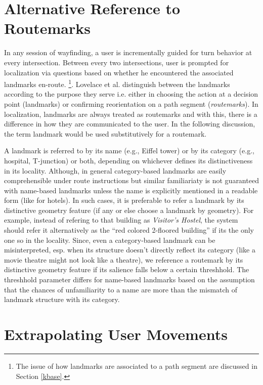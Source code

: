 \documentclass{iitkthesis}
\begin{document}
\section{Alternative Reference to Routemarks}
\label{sec:altref}
In any session of wayfinding, a user is incrementally guided for turn behavior at every intersection. Between every two intersections, user is prompted for localization via questions based on whether he encountered the associated landmarks en-route. \footnote{The issue of how landmarks are associated to a path segment are discussed in Section \ref{kbase}.}. Lovelace et al. \cite{lovelace} distinguish between the landmarks according to the purpose they serve i.e. either in choosing the action at a decision point (landmarks) or confirming reorientation on a path segment (\textit{routemarks}). In localization, landmarks are always treated as routemarks and with this, there is a difference in how they are communicated to the user. In the following discussion, the term landmark would be used substitutively for a routemark. 

A landmark is referred to by its name (e.g., Eiffel tower) or by its category (e.g., hospital, T-junction) or both, depending on whichever defines its distinctiveness in its locality. Although, in general category-based landmarks are easily comprehensible under route instructions but similar familiariaty is not guaranteed with name-based landmarks unless the name is explicitly mentioned in a readable form (like for hotels). In such cases, it is preferable to refer a landmark by its distinctive geometry feature (if any or else choose a landmark by geometry). For example, instead of refering to that building as \textit{Visitor's Hostel}, the system should refer it alternatively as the ``red colored 2-floored building'' if its the only one so in the locality. Since, even a category-based landmark can be misinterpreted, esp. when its structure doesn't directly reflect its category (like a movie theatre might not look like a theatre), we reference a routemark by its distinctive geometry feature if its salience falls below a certain threshhold. The threshhold parameter differs for name-based landmarks based on the assumption that the chances of unfamiliarity to a name are more than the mismatch of landmark structure with its category.
\section{Extrapolating User Movements}
\end{document}
